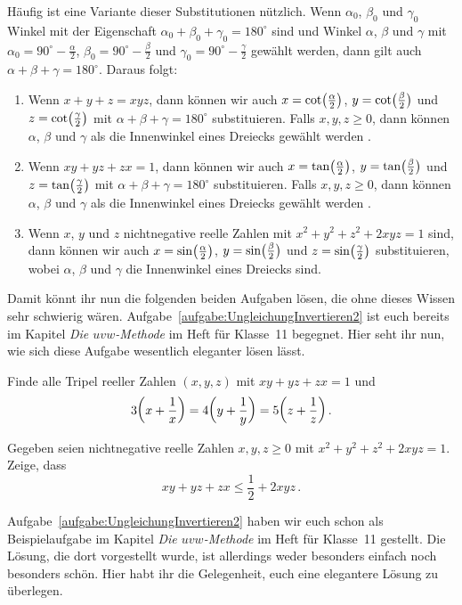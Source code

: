 Häufig ist eine Variante dieser Substitutionen nützlich. Wenn $\alpha_0$, $\beta_0$ und $\gamma_0$ Winkel mit der Eigenschaft $\alpha_0+\beta_0+\gamma_0=180^\circ$ sind und Winkel $\alpha$, $\beta$ und $\gamma$ mit $\alpha_0=90^\circ-\frac\alpha2$, $\beta_0=90^\circ-\frac\beta2$ und $\gamma_0=90^\circ-\frac\gamma2$ gewählt werden, dann gilt auch $\alpha+\beta+\gamma=180^\circ$. Daraus folgt:
\begin{enumerate}[label={$(\alph*)$},ref={$(\alph*)$}]\itshape
	\item Wenn $x+y+z=xyz$, dann können wir auch $x=\cot\parens[\big]{\frac{\alpha}2}$, $y=\cot\parens[\big]{\frac{\beta}2}$ und $z=\cot\parens[\big]{\frac{\gamma}2}$ mit $\alpha+\beta+\gamma=180^\circ$ substituieren. Falls $x,y,z\geqslant 0$, dann können $\alpha$, $\beta$ und $\gamma$ als die Innenwinkel eines Dreiecks gewählt werden .
	\item Wenn $xy+yz+zx=1$, dann können wir auch $x=\tan\parens[\big]{\frac{\alpha}2}$, $y=\tan\parens[\big]{\frac{\beta}2}$ und $z=\tan\parens[\big]{\frac{\gamma}2}$ mit $\alpha+\beta+\gamma=180^\circ$ substituieren. Falls $x,y,z\geqslant 0$, dann können $\alpha$, $\beta$ und $\gamma$ als die Innenwinkel eines Dreiecks gewählt werden .
	\item Wenn $x$, $y$ und $z$ nichtnegative reelle Zahlen mit $x^2+y^2+z^2+2xyz=1$ sind, dann können wir auch $x=\sin\parens[\big]{\frac{\alpha}2}$, $y=\sin\parens[\big]{\frac{\beta}2}$ und $z=\sin\parens[\big]{\frac{\gamma}2}$ substituieren, wobei $\alpha$, $\beta$ und $\gamma$ die Innenwinkel eines Dreiecks sind.
\end{enumerate}
Damit könnt ihr nun die folgenden beiden Aufgaben lösen, die ohne dieses Wissen sehr schwierig wären. Aufgabe~\ref{aufgabe:UngleichungInvertieren2} ist euch bereits im Kapitel \emph{Die $uvw$-Methode} im Heft für Klasse~11 begegnet. Hier seht ihr nun, wie sich diese Aufgabe wesentlich eleganter lösen lässt.
\begin{aufgabe*}\label{aufgabe:521236}
	Finde alle Tripel reeller Zahlen $(x,y,z)$ mit $xy+yz+zx=1$ und
	\begin{equation*}
		3\parens*{x+\frac 1x}=4\parens*{y+\frac 1y}=5\parens*{z+\frac 1z}\,.
	\end{equation*}
\end{aufgabe*}
\begin{aufgabe*}[*]\label{aufgabe:UngleichungInvertieren2}
	Gegeben seien nichtnegative reelle Zahlen $x,y,z\geqslant 0$ mit $x^2+y^2+z^2+2xyz=1$. Zeige, dass
	\begin{equation*}
		xy+yz+zx\leqslant \frac12+2xyz\,.
	\end{equation*}
\end{aufgabe*}
Aufgabe~\ref{aufgabe:UngleichungInvertieren2} haben wir euch schon als Beispielaufgabe im Kapitel \emph{Die $uvw$-Methode} im Heft für Klasse~11 gestellt. Die Lösung, die dort vorgestellt wurde, ist allerdings weder besonders einfach noch besonders schön. Hier habt ihr die Gelegenheit, euch eine elegantere Lösung zu überlegen.



